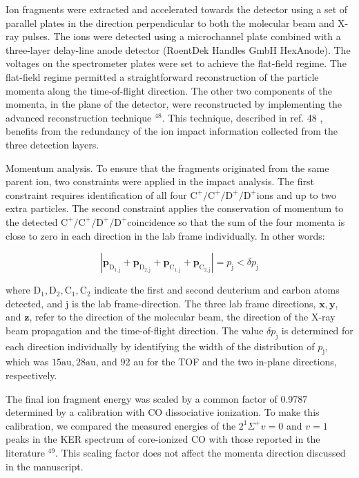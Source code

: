\documentclass[10pt]{article}
\begin{document}
Ion fragments were extracted and accelerated towards the detector using a set of parallel plates in the direction perpendicular to both the molecular beam and X-ray pulses. The ions were detected using a microchannel plate combined with a three-layer delay-line anode detector (RoentDek Handles GmbH HexAnode). The voltages on the spectrometer plates were set to achieve the flat-field regime. The flat-field regime permitted a straightforward reconstruction of the particle momenta along the time-of-flight direction. The other two components of the momenta, in the plane of the detector, were reconstructed by implementing the advanced reconstruction technique ${ }^{48}$. This technique, described in ref. 48 , benefits from the redundancy of the ion impact information collected from the three detection layers.

Momentum analysis. To ensure that the fragments originated from the same parent ion, two constraints were applied in the impact analysis. The first constraint requires identification of all four $\mathrm{C}^{+} / \mathrm{C}^{+} / \mathrm{D}^{+} / \mathrm{D}^{+}$ions and up to two extra particles. The second constraint applies the conservation of momentum to the detected $\mathrm{C}^{+} / \mathrm{C}^{+} / \mathrm{D}^{+} / \mathrm{D}^{+}$coincidence so that the sum of the four momenta is close to zero in each direction in the lab frame individually. In other words:


\begin{equation*}
\left|\mathbf{p}_{\mathrm{D}_{1, \mathrm{j}}}+\mathbf{p}_{\mathrm{D}_{2, \mathrm{j}}}+\mathbf{p}_{\mathrm{C}_{1, \mathrm{j}}}+\mathbf{p}_{\mathrm{C}_{2, \mathrm{j}}}\right|=p_{\mathrm{j}}<\delta p_{\mathrm{j}} \tag{3}
\end{equation*}


where $\mathrm{D}_{1}, \mathrm{D}_{2}, \mathrm{C}_{1}, \mathrm{C}_{2}$ indicate the first and second deuterium and carbon atoms detected, and j is the lab frame-direction. The three lab frame directions, $\mathbf{x}, \mathbf{y}$, and $\mathbf{z}$, refer to the direction of the molecular beam, the direction of the X-ray beam propagation and the time-of-flight direction. The value $\delta p_{\mathrm{j}}$ is determined for each direction individually by identifying the width of the distribution of $p_{\mathrm{j}}$, which was $15 \mathrm{au}, 28 \mathrm{au}$, and 92 au for the TOF and the two in-plane directions, respectively.

The final ion fragment energy was scaled by a common factor of 0.9787 determined by a calibration with CO dissociative ionization. To make this calibration, we compared the measured energies of the $2^{1} \Sigma^{+} v=0$ and $v=1$ peaks in the KER spectrum of core-ionized CO with those reported in the literature ${ }^{49}$. This scaling factor does not affect the momenta direction discussed in the manuscript.
\end{document}
